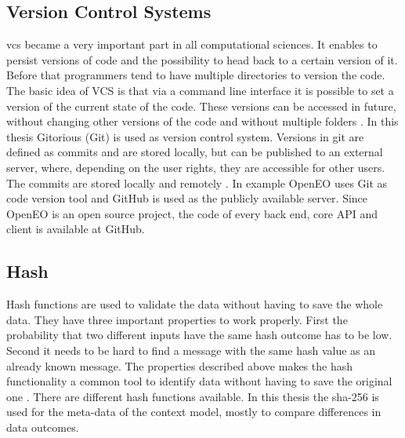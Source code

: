 \documentclass[draft,final]{vutinfth} %
\begin{document}
\subsection{Version Control Systems}\label{Version Control Systems}
\gls{vcs} became a very important part in all computational sciences. It enables to persist versions of code and the possibility to head back to a certain version of it. Before that programmers tend to have multiple directories to version the code. The basic idea of VCS is that via a command line interface it is possible to set a version of the current state of the code. These versions can be accessed in future, without changing other versions of the code and without multiple folders \cite{10.1109/MCSE.2009.194}. 
In this thesis Gitorious (Git) is used as version control system. Versions in git are defined as commits and are stored locally, but can be published to an external server, where, depending on the user rights, they are accessible for other users. The commits are stored locally and remotely \cite{QuickGit}. In example OpenEO uses Git as code version tool and GitHub is used as the publicly available server. Since OpenEO is an open source project, the code of every back end, core API and client is available at GitHub.  

\subsection{Hash}\label{Hash}
Hash functions are used to validate the data without having to save the whole data. They have three important properties to work properly. First the probability that two different inputs have the same hash outcome has to be low. Second it needs to be hard to find a message with the same hash value as an already known message. The properties described above makes the hash functionality a common tool to identify data without having to save the original one \cite{3b412889270f46f59740fbf1ca8cd7e0}.  
There are different hash functions available. In this thesis the \gls{sha}-256 is used for the meta-data of the context model, mostly to compare differences in data outcomes.

\end{document}
